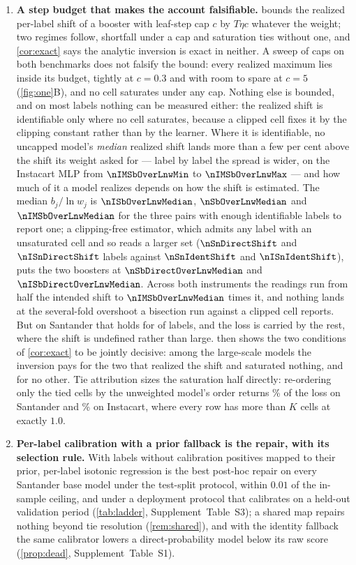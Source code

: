 \documentclass[sigconf,nonacm]{acmart}
\newcommand{\Supp}[1]{Supplement~#1}  %
\begin{document}
\begin{enumerate}[leftmargin=*,nosep]
\item \textbf{A step budget that makes the account falsifiable.}  bounds the realized per-label shift of a booster with leaf-step cap $c$ by $T\eta c$ whatever the weight; two regimes follow, shortfall under a cap and saturation ties without one, and \cref{cor:exact} says the analytic inversion is exact in neither. A sweep of \ncapN{} caps on both benchmarks does not falsify the bound: every realized maximum lies inside its budget, tightly at $c=0.3$ and with room to spare at $c=5$ (\cref{fig:one}B), and no cell saturates under any cap. Nothing else is bounded, and on most labels nothing can be measured either: the realized shift is identifiable only where no cell saturates, because a clipped cell fixes it by the clipping constant rather than by the learner. Where it is identifiable, no uncapped model's \emph{median} realized shift lands more than a few per cent above the shift its weight asked for --- label by label the spread is wider, on the Instacart MLP from $\nIMSbOverLnwMin$ to $\nIMSbOverLnwMax$ --- and how much of it a model realizes depends on how the shift is estimated. The median $b_j/\ln w_j$ is $\nISbOverLnwMedian$, $\nSbOverLnwMedian$ and $\nIMSbOverLnwMedian$ for the three pairs with enough identifiable labels to report one; a clipping-free estimator, which admits any label with an unsaturated cell and so reads a larger set ($\nSnDirectShift$ and $\nISnDirectShift$ labels against $\nSnIdentShift$ and $\nISnIdentShift$), puts the two boosters at $\nSbDirectOverLnwMedian$ and $\nISbDirectOverLnwMedian$. Across both instruments the readings run from half the intended shift to $\nIMSbOverLnwMedian$ times it, and nothing lands at the several-fold overshoot a bisection run against a clipped cell reports. But on Santander that holds for \nSnIdentShift{} of \nnLabels{} labels, and the loss is carried by the rest, where the shift is undefined rather than large.  then shows the two conditions of \cref{cor:exact} to be jointly decisive: among the large-scale models the inversion pays for the two that realized the shift and saturated nothing, and for no other. Tie attribution sizes the saturation half directly: re-ordering only the tied cells by the unweighted model's order returns \ntieShareUnw\% of the loss on Santander and \nItieShareUnw\% on Instacart, where every row has more than $K$ cells at exactly $1.0$.
\item \textbf{Per-label calibration with a prior fallback is the repair, with its selection rule.} With labels without calibration positives mapped to their prior, per-label isotonic regression is the best post-hoc repair on every Santander base model under the test-split protocol, within $0.01$ of the in-sample ceiling, and under a deployment protocol that calibrates on a held-out validation period (\cref{tab:ladder}, \Supp{Table~S3}); a shared map repairs nothing beyond tie resolution (\cref{rem:shared}), and with the identity fallback the same calibrator lowers a direct-probability model below its raw score (\cref{prop:dead}, \Supp{Table~S1}).

\end{enumerate}
\end{document}
